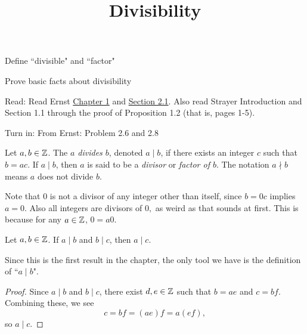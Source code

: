 \documentclass{ximera}
\title{Divisibility}
\begin{document}
\begin{abstract}
\end{abstract}
\maketitle


\begin{obj}
  \item Define ``divisible" and ``factor"
  \item Prove basic facts about divisibility
\end{obj}
 

\begin{pre}
  \item[Read:]  Read Ernst  \href{https://danaernst.com/IBL-IntroToProof/pretext/chap_intro.html}{Chapter 1} and \href{https://danaernst.com/IBL-IntroToProof/pretext/sec_baby_number_theory.html}{Section 2.1}. Also read Strayer Introduction and Section 1.1 through the proof of Proposition 1.2 (that is, pages 1-5).
  
  \item[Turn in:] From Ernst: Problem 2.6 and 2.8
\end{pre}


\begin{defn}[$a$ divides $b$]\label{defn:divides}
  Let $a,b\in \mathbb Z$. The \emph{$a$ divides $b$}, denoted $a\mid b$,  if there exists an integer $c$ such that $b=ac$. 
  If $a\mid b$, then $a$ is said to be a \emph{divisor} or \emph{factor of $b$}. The notation $a\nmid b$ means $a$ does not divide $b$.
\end{defn}

Note that $0$ is not a divisor of any integer other than itself, since $b=0c$ implies $a=0$. Also all integers are divisors of $0,$ as weird as that sounds at first. This is because for any $a\in\mathbb Z$, $0=a0$.

\begin{proposition}\label{prop:div-trans}
Let $a,b\in\mathbb Z$. If $a\mid b$ and $b \mid c$, then $a\mid c$.
\end{proposition}

Since this is the first result in the chapter, the only tool we have is the definition of ``$a\mid b$". 

\begin{proof}
  Since $a\mid b$ and $b \mid c$, there exist $d,e\in\mathbb Z$ such that $b=ae$ and $c=bf$. Combining these, we see \[c=bf=(ae)f=a(ef),\] so $a\mid c$.
\end{proof}
\end{document}
